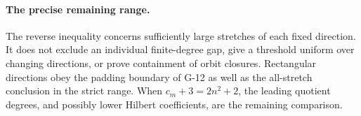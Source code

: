 \paragraph{The precise remaining range.}
The reverse inequality concerns sufficiently large stretches of
each fixed direction. It does not exclude an individual
finite-degree gap, give a threshold uniform over changing
directions, or prove containment of orbit closures. Rectangular
directions obey the padding boundary of G-12 as well as the
all-stretch conclusion in the strict range. When
$c_m+3=2n^2+2$, the leading quotient degrees, and
possibly lower Hilbert coefficients, are the remaining comparison.

